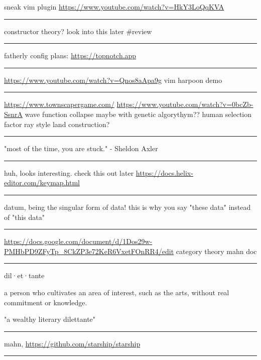 \documentclass[letterpaper]{article}
\begin{document}
sneak vim plugin \url{https://www.youtube.com/watch?v=HkY3LoQqKVA}

\noindent\rule{\textwidth}{0.5pt}

constructor theory? look into this later \#review

\noindent\rule{\textwidth}{0.5pt}

fatherly config plans: \url{https://topnotch.app}

\noindent\rule{\textwidth}{0.5pt}

\url{https://www.youtube.com/watch?v=Qnos8aApa9g} vim harpoon demo

\noindent\rule{\textwidth}{0.5pt}

\href{https://www.youtube.com/redirect?event=video\_description\&redir\_token=QUFFLUhqbWU5b05DZzZyX0syeGltbVAzSUZGWkFySTFEZ3xBQ3Jtc0tuX1VZUTFUcHFsaklnd2FFYnlFV1pseDU3Q1hxMm40aWcybXVtMGNkVXhrYWVQaThuY0E2dXJNR2dkVm1rZ3A3NkVTZ2pJWEhVblVDV0ZKcXdFdFZTdHA5b3V4aXExVWFRLXVpeVhtSlpnNDhBYjU5Yw\&q=https\%3A\%2F\%2Fwww.townscapergame.com\%2F}{https://www.townscapergame.com/}
\url{https://www.youtube.com/watch?v=0bcZb-SsnrA} wave function collapse maybe
with genetic algorythym?? human selection factor ray style land
construction?

\noindent\rule{\textwidth}{0.5pt}

"most of the time, you are stuck." - Sheldon Axler

\noindent\rule{\textwidth}{0.5pt}

huh, looks interesting. check this out later
\url{https://docs.helix-editor.com/keymap.html}

\noindent\rule{\textwidth}{0.5pt}

datum, being the singular form of data! this is why you say "these data"
instead of "this data"

\noindent\rule{\textwidth}{0.5pt}

\url{https://docs.google.com/document/d/1Dos29w-PMHbPD9ZFyTp\_8CkZP3e72KeR6VxetFOnRR4/edit}
category theory mahn doc

\noindent\rule{\textwidth}{0.5pt}

dil·et·tante

a person who cultivates an area of interest, such as the arts, without
real commitment or knowledge.

"a wealthy literary dilettante"

\noindent\rule{\textwidth}{0.5pt}

mahn, \url{https://github.com/starship/starship}

\noindent\rule{\textwidth}{0.5pt}
\end{document}
